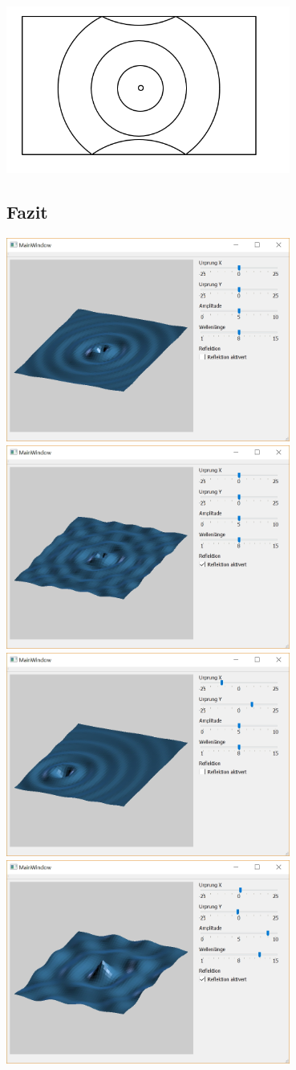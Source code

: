 ﻿\documentclass[12pt,a4paper]{scrartcl}
\begin{document}
\includegraphics[width=0.7\textwidth]{Images/Reflextion.png}


\subsection{Fazit}
\includegraphics[width=0.7\textwidth]{Images/Wave1.jpg}
\includegraphics[width=0.7\textwidth]{Images/WavewithReflextion.jpg}
\includegraphics[width=0.7\textwidth]{Images/xAndy.jpg}
\includegraphics[width=0.7\textwidth]{Images/HighaAndl.jpg}
\end{document}
